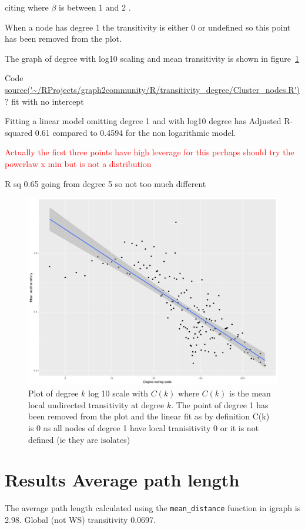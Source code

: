 citing \cite{yook2004functional} where $\beta$ is between 1 and 2 \cite{albert2005scale}.

When a node has degree 1 the transitivity is  either 0 or undefined so this point has been removed from the plot. 

The graph of degree with log10 scaling and mean transitivity is shown in figure~\ref{fig:C(k)_remove0}

Code \url{source('~/RProjects/graph2community/R/transitivity_degree/Cluster_nodes.R')}
? fit with no intercept

Fitting a linear model omitting degree 1 and with log10 degree has Adjusted R-squared 0.61 compared to 0.4594 for the non logarithmic model.

\textcolor{red}{Actually the first three points have high leverage for this perhaps should try the powerlaw x min but is not a distribution}

R sq 0.65 going from degree 5 so not too much different

\begin{figure}
    \centering
    \includegraphics[width=\textwidth]{images/Rplot_k(c)_remove0.png}
    \caption{Plot of degree $k$ log 10 scale with $C(k)$ where $C(k)$ is the mean local undirected transitivity at degree $k$. The point of degree 1 has been removed from the plot and the linear fit as by definition C(k) is 0 as all nodes of degree 1 have local tranisitivity 0 or it is not defined (ie they are isolates)}
    \label{fig:C(k)_remove0}
\end{figure}
\section{ Results Average path length}
\label{sec:Results average path length and transitivity}
The average path length calculated using the \texttt{mean\_distance} function in igraph is 2.98. Global (not WS) transitivity 0.0697.

